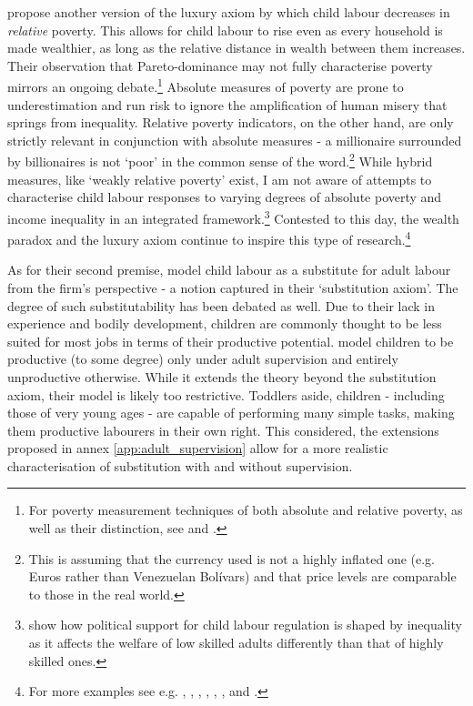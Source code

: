 \documentclass[a4paper,12pt]{article}
\theoremstyle{plain}
\theoremstyle{definition}
\theoremstyle{definition}
\theoremstyle{definition}
\theoremstyle{definition}
\begin{document}
\citet{Dwibedi2017} propose another version of the luxury axiom by which child labour decreases in \textit{relative} poverty. This allows for child labour to rise even as every household is made wealthier, as long as the relative distance in wealth between them increases. Their observation that Pareto-dominance may not fully characterise poverty mirrors an ongoing debate.\footnote{For poverty measurement techniques of both absolute and relative poverty, as well as their distinction, see \citet{Sen1976} and \citet{Ravallion2020}.} Absolute measures of poverty are prone to underestimation and run risk to ignore the amplification of human misery that springs from inequality. Relative poverty indicators, on the other hand, are only strictly relevant in conjunction with absolute measures - a millionaire surrounded by billionaires is not `poor' in the common sense of the word.\footnote{This is assuming that the currency used is not a highly inflated one (e.g. Euros rather than Venezuelan Bolívars) and that price levels are comparable to those in the real world.} While hybrid measures, like `weakly relative poverty' \citep{Ravallion2009} exist, I am not aware of attempts to characterise child labour responses to varying degrees of absolute poverty and income inequality in an integrated framework.\footnote{\citet{DAlessandro2016} show how political support for child labour regulation is shaped by inequality as it affects the welfare of low skilled adults differently than that of highly skilled ones.} Contested to this day, the wealth paradox and the luxury axiom continue to inspire this type of research.\footnote{For more examples see e.g. \citet{Dumas2007}, \citet{DelCarpio2008}, \citet{DelCarpio2012}, \citet{Edmonds2012}, \citet{Sarkar2016}, \citet{Oryoie2017}, and \citet{Noack2019}.}

As for their second premise, \citet{Basu1998} model child labour as a substitute for adult labour from the firm's perspective - a notion captured in their `substitution axiom'. The degree of such substitutability has been debated as well. Due to their lack in experience and bodily development, children are commonly thought to be less suited for most jobs in terms of their productive potential. \citet{Bar2009} model children to be productive (to some degree) only under adult supervision and entirely unproductive otherwise. While it extends the theory beyond the substitution axiom, their model is likely too restrictive. Toddlers aside, children - including those of very young ages - are capable of performing many simple tasks, making them productive labourers in their own right. This considered, the extensions proposed in annex \ref{app:adult_supervision} allow for a more realistic characterisation of substitution with and without supervision.
\end{document}
